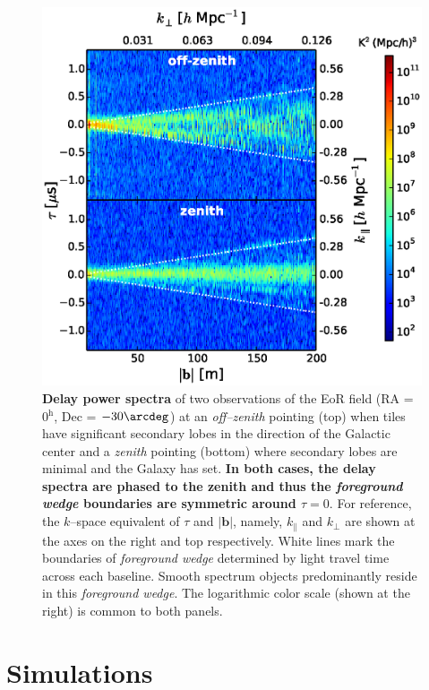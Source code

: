 \documentclass[preprint2,iop,numberedappendix]{emulateapj}
\begin{document}
\begin{figure}[htb]
\centering
\includegraphics[width=\linewidth]{fig4.eps}
\caption{{\bf Delay power spectra} of two observations of the EoR field (RA = 0$^\textrm{h}$, Dec = $-30\arcdeg$) at an {\it off--zenith} pointing (top) when tiles have significant secondary lobes in the direction of the Galactic center and a {\it zenith} pointing (bottom) where secondary lobes are minimal and the Galaxy has set. {\bf In both cases, the delay spectra are phased to the zenith and thus the {\it foreground wedge} boundaries are symmetric around $\tau=0$}. For reference, the $k$--space equivalent of $\tau$ and $|\boldsymbol{b}|$, namely, $k_\parallel$ and $k_\perp$ are shown at the axes on the right and top respectively. White lines mark the boundaries of {\it foreground wedge} determined by light travel time across each baseline. Smooth spectrum objects predominantly reside in this {\it foreground wedge}. The logarithmic color scale (shown at the right) is common to both panels. \label{fig:fhd_data}}
\end{figure}

\section{Simulations}\label{sec:modeling}
\end{document}
